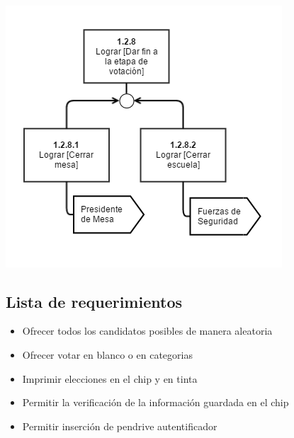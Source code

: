 \\
\includegraphics[scale=0.55]{imagenes/Diagramas/12/128.png}


\newpage
\subsection{Lista de requerimientos}

\begin{itemize}
\item Ofrecer todos los candidatos posibles de manera aleatoria
\item Ofrecer votar en blanco o en categorias
\item Imprimir elecciones en el chip y en tinta
\item Permitir la verificación de la información guardada en el chip
\item Permitir inserción de pendrive autentificador
\end{itemize}